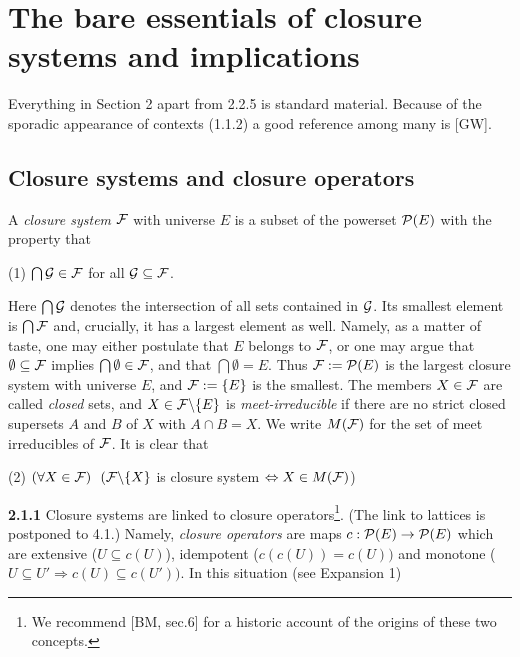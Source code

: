 \documentclass[11pt]{article}
\newcommand{\ra}{\rightarrow}
\newcommand{\Ra}{\Rightarrow}
\begin{document}
\section{The bare essentials of closure systems and implications}

Everything in Section 2 apart from 2.2.5 is standard material.
Because of the sporadic appearance of contexts (1.1.2) a good reference among many is [GW].






\subsection{Closure systems and closure operators}

A {\it closure system} ${\cal F}$ with universe $E$ is a subset of the powerset ${\cal P}(E)$ with the property that

(1) \quad $\bigcap {\cal G} \in {\cal F}$ for all ${\cal G} \subseteq {\cal F}$.

Here $\bigcap {\cal G}$ denotes the intersection of all sets contained in ${\cal G}$. Its smallest element is $\bigcap {\cal F}$ and, crucially, it has a largest element as well. Namely, as a matter of taste, one may either postulate that $E$ belongs to ${\cal F}$, or one may argue that $\emptyset \subseteq {\cal F}$ implies $\bigcap \emptyset \in {\cal F}$, and that $\bigcap \emptyset = E$. Thus ${\cal F}: = {\cal P}(E)$ is the largest closure system with universe $E$, and ${\cal F}: = \{E\}$ is the smallest. The members $X\in {\cal F}$ are called {\it closed} sets, and $X \in {\cal F} \backslash \{E\}$ is 
{\it meet-irreducible} if there are no strict closed supersets $A$ and $B$ of $X$ with $A \cap B = X$. We write $M({\cal F})$ for the set of meet irreducibles of ${\cal F}$. It is clear that

(2)  \quad $(\forall X \in {\cal  F}) \ \ ({\cal F} \backslash \{X\}$ is closure system $\Leftrightarrow X \in M({\cal F})$)




{\bf 2.1.1} Closure systems are linked to closure operators\footnote{We recommend [BM, sec.6] for a historic account of the origins of these two concepts.}. (The link to lattices is postponed to 4.1.) Namely, {\it closure operators} are maps $c: {\cal P}(E) \ra {\cal P}(E)$ which are extensive ($U \subseteq c(U)$), idempotent ($c(c(U)) = c(U))$ and monotone ($U \subseteq U'\Ra c(U) \subseteq c(U'))$. In this situation (see Expansion 1)
\end{document}

